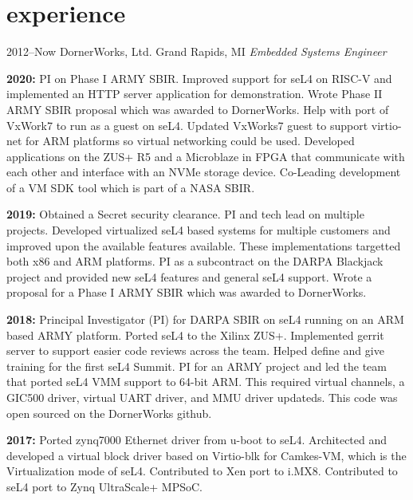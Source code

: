 \documentclass[a4paper]{cv-friggeri-x}
\begin{document}

\section{experience}

\begin{entrylist}


\entry
{2012--Now}
{DornerWorks, Ltd.}
{Grand Rapids, MI}
{\emph{Embedded Systems Engineer}}

\smallentry
{\textbf{2020:}  PI on Phase I ARMY SBIR. Improved support for seL4 on RISC-V and implemented an HTTP server application for demonstration. Wrote Phase II ARMY SBIR proposal which was awarded to DornerWorks. Help with port of VxWork7 to run as a guest on seL4. Updated VxWorks7 guest to support virtio-net for ARM platforms so virtual networking could be used. Developed applications on the ZUS+ R5 and a Microblaze in FPGA that communicate with each other and interface with an NVMe storage device. Co-Leading development of a VM SDK tool which is part of a NASA SBIR.}

\smallentry
{\textbf{2019:} Obtained a Secret security clearance. PI and tech lead on multiple projects. Developed virtualized seL4 based systems for multiple customers and improved upon the available features available. These implementations targetted both x86 and ARM platforms. PI as a subcontract on the DARPA Blackjack project and provided new seL4 features and general seL4 support. Wrote a proposal for a Phase I ARMY SBIR which was awarded to DornerWorks.}

\smallentry
{\textbf{2018:}  Principal Investigator (PI) for DARPA SBIR on seL4 running on an ARM based ARMY platform. Ported seL4 to the Xilinx ZUS+. Implemented gerrit server to support easier code reviews across the team. Helped define and give training for the first seL4 Summit. PI for an ARMY project and led the team that ported seL4 VMM support to 64-bit ARM. This required virtual channels, a GIC500 driver, virtual UART driver, and MMU driver updateds. This code was open sourced on the DornerWorks github.}

\smallentry
{\textbf{2017:} Ported zynq7000 Ethernet driver from u-boot to seL4. Architected and developed a virtual block driver based on Virtio-blk for Camkes-VM, which is the Virtualization mode of seL4. Contributed to Xen port to i.MX8. Contributed to seL4 port to Zynq UltraScale+ MPSoC.}


\end{entrylist}
\end{document}

